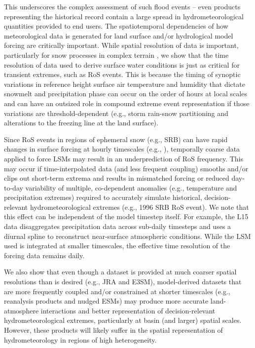 \documentclass[nhess, manuscript]{copernicus}
\begin{document}

This underscores the complex assessment of such flood events -- even products representing the historical record contain a large spread in hydrometeorological quantities provided to end users. The spatiotemporal dependencies of how meteorological data is generated for land surface and/or hydrological model forcing are critically important.
While spatial resolution of data is important, particularly for snow processes in complex terrain \citep{henn2018an,Woodburn2021}, we show that the time resolution of data used to derive surface water conditions is just as critical for transient extremes, such as RoS events.
This is because the timing of synoptic variations in reference height surface air temperature and humidity that dictate snowmelt and precipitation phase can occur on the order of hours at local scales and can have an outsized role in compound extreme event representation if those variations are threshold-dependent (e.g., storm rain-snow partitioning and alterations to the freezing line at the land surface).

Since RoS events in regions of ephemeral snow (e.g., SRB) can have rapid changes in surface forcing at hourly timescales (e.g., \citet{leathers1998severe}), temporally coarse data applied to force LSMs may result in an underprediction of RoS frequency.
This may occur if time-interpolated data (and less frequent coupling) smooths and/or clips out short-term extrema and results in mismatched forcing or reduced day-to-day variability of multiple, co-dependent anomalies (e.g., temperature and precipitation extremes) required to accurately simulate historical, decision-relevant hydrometeorological extremes (e.g., 1996 SRB RoS event). We note that this effect can be independent of the model timestep itself. For example, the L15 data disaggregates precipitation data across sub-daily timesteps and uses a diurnal spline to reconstruct near-surface atmospheric conditions. While the LSM used is integrated at smaller timescales, the effective time resolution of the forcing data remains daily.

We also show that even though a dataset is provided at much coarser spatial resolutions than is desired (e.g., JRA and E3SM), model-derived datasets that are more frequently coupled and/or constrained at shorter timescales (e.g., reanalysis products and nudged ESMs) may produce more accurate land-atmosphere interactions and better representation of decision-relevant hydrometeorological extremes, particularly at basin (and larger) spatial scales. However, these products will likely suffer in the spatial representation of hydrometeorology in regions of high heterogeneity.
\end{document}

